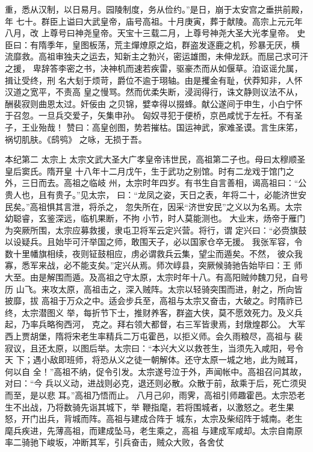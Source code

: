 \documentclass[12pt,UTF8]{ctexbook}
\begin{document}
重，悉从汉制，以日易月。园陵制度，务从俭约。”是日，崩于太安宫之垂拱前殿，年
七十。群臣上谥曰大武皇帝，庙号高祖。十月庚寅，葬于献陵。高宗上元元年八月，改
上尊号曰神尧皇帝。天宝十三载二月，上尊号神尧大圣大光孝皇帝。
史臣曰：有隋季年，皇图板荡，荒主燀燎原之焰，群盗发逐鹿之机，殄暴无厌，横
流靡救。高祖审独夫之运去，知新主之勃兴，密运雄图，未伸龙跃。而屈己求可汗之援，
卑辞答李密之书，决神机而速若疾雷，驱豪杰而从如偃草。洎讴谣允属，揖让受终，刑
名大刬于烦苛，爵位不逾于珝轴。由是攫金有耻，伏莽知非，人怀汉道之宽平，不责高
皇之慢骂。然而优柔失断，浸润得行，诛文静则议法不从，酬裴寂则曲恩太过。奸佞由
之贝锦，嬖幸得以掇蜂。献公遂间于申生，小白宁怀于召忽。一旦兵交爱子，矢集申孙。
匈奴寻犯于便桥，京邑咸忧于左衽。不有圣子，王业殆哉！
赞曰：高皇创图，势若摧枯。国运神武，家难圣谟。言生床笫，祸切肌肤。《鸱鸮》
之咏，无损于吾。

本纪第二 太宗上    
太宗文武大圣大广孝皇帝讳世民，高祖第二子也。母曰太穆顺圣皇后窦氏。隋开皇
十八年十二月戊午，生于武功之别馆。时有二龙戏于馆门之外，三日而去。高祖之临岐
州，太宗时年四岁。有书生自言善相，谒高祖曰：“公贵人也，且有贵子。”见太宗，
曰：“龙凤之姿，天日之表，年将二十，必能济世安民矣。”高祖惧其言泄，将杀之，
忽失所在，因采“济世安民”之义以为名焉。太宗幼聪睿，玄鉴深远，临机果断，不拘
小节，时人莫能测也。
大业末，炀帝于雁门为突厥所围，太宗应募救援，隶屯卫将军云定兴营。将行，谓
定兴曰：“必赍旗鼓以设疑兵。且始毕可汗举国之师，敢围天子，必以国家仓卒无援。
我张军容，令数十里幡旗相续，夜则钲鼓相应，虏必谓救兵云集，望尘而遁矣。不然，
彼众我寡，悉军来战，必不能支矣。”定兴从焉。师次崞县，突厥候骑驰告始毕曰：王
师大至。由是解围而遁。及高祖之守太原，太宗时年十八。有高阳贼帅魏刀兒，自号历
山飞。来攻太原，高祖击之，深入贼阵。太宗以轻骑突围而进，射之，所向皆披靡，拔
高祖于万众之中。适会步兵至，高祖与太宗又奋击，大破之。时隋祚已终，太宗潜图义
举，每折节下士，推财养客，群盗大侠，莫不愿效死力。及义兵起，乃率兵略徇西河，
克之。拜右领大都督，右三军皆隶焉，封燉煌郡公。
大军西上贾胡堡，隋将宋老生率精兵二万屯霍邑，以拒义师。会久雨粮尽，高祖与
裴寂议，且还太原，以图后举。太宗曰：“本兴大义以救苍生，当须先入咸阳，号令天
下；遇小敌即班师，将恐从义之徒一朝解体。还守太原一城之地，此为贼耳，何以自
全！”高祖不纳，促令引发。太宗遂号泣于外，声闻帐中。高祖召问其故，对曰：“今
兵以义动，进战则必克，退还则必散。众散于前，敌乘于后，死亡须臾而至，是以悲
耳。”高祖乃悟而止。
八月己卯，雨霁，高祖引师趣霍邑。太宗恐老生不出战，乃将数骑先诣其城下，举
鞭指麾，若将围城者，以激怒之。老生果怒，开门出兵，背城而阵。高祖与建成合阵于
城东，太宗及柴绍阵于城南。老生麾兵疾进，先薄高祖，而建成坠马，老生乘之，高祖
与建成军咸却。太宗自南原率二骑驰下峻坂，冲断其军，引兵奋击，贼众大败，各舍仗
\end{document}
